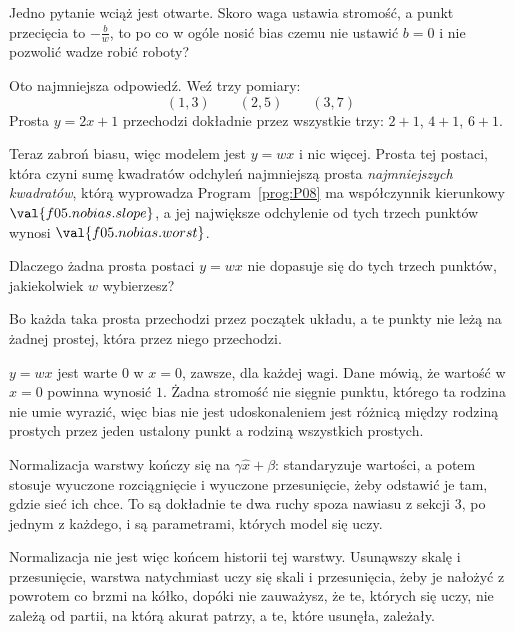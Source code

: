 \begin{fr}
Jedno pytanie wciąż jest otwarte. Skoro waga ustawia stromość, a punkt
przecięcia to $-\frac{b}{w}$, to po co w ogóle nosić bias \dash{} czemu nie
ustawić $b = 0$ i nie pozwolić wadze robić roboty?

Oto najmniejsza odpowiedź. Weź trzy pomiary:
\[ (1, 3) \qquad (2, 5) \qquad (3, 7) \]
Prosta $y = 2x + 1$ przechodzi dokładnie przez wszystkie trzy: $2 + 1$,
$4 + 1$, $6 + 1$.

Teraz zabroń biasu, więc modelem jest $y = wx$ i nic więcej. Prosta tej
postaci, która czyni sumę kwadratów odchyleń najmniejszą \dash{} prosta
\emph{najmniejszych kwadratów}, którą wyprowadza Program~\ref{prog:P08} \dash{}
ma współczynnik kierunkowy $\val{f05.nobias.slope}$, a jej największe
odchylenie od tych trzech punktów wynosi $\val{f05.nobias.worst}$.

Dlaczego żadna prosta postaci $y = wx$ nie dopasuje się do tych trzech punktów,
jakiekolwiek $w$ wybierzesz?
\nextframe
\end{fr}

\begin{fr}
\begin{ansblock}
Bo każda taka prosta przechodzi przez początek układu, a te punkty nie leżą na
żadnej prostej, która przez niego przechodzi.
\end{ansblock}

$y = wx$ jest warte $0$ w $x = 0$, zawsze, dla każdej wagi. Dane mówią, że
wartość w $x = 0$ powinna wynosić $1$. Żadna stromość nie sięgnie punktu,
którego ta rodzina nie umie wyrazić, więc bias nie jest udoskonaleniem \dash{}
jest różnicą między rodziną prostych przez jeden ustalony punkt a rodziną
wszystkich prostych.

\begin{aibox}
Normalizacja warstwy kończy się na $\gamma \hat{x} + \beta$: standaryzuje
wartości, a potem stosuje wyuczone rozciągnięcie i wyuczone przesunięcie, żeby
odstawić je tam, gdzie sieć ich chce. To są dokładnie te dwa ruchy spoza
nawiasu z sekcji 3, po jednym z każdego, i są parametrami, których model się
uczy.

Normalizacja nie jest więc końcem historii tej warstwy. Usunąwszy skalę i
przesunięcie, warstwa natychmiast uczy się skali i przesunięcia, żeby je
nałożyć z powrotem \dash{} co brzmi na kółko, dopóki nie zauważysz, że te,
których się uczy, nie zależą od partii, na którą akurat patrzy, a te, które
usunęła, zależały.
\end{aibox}
\end{fr}

